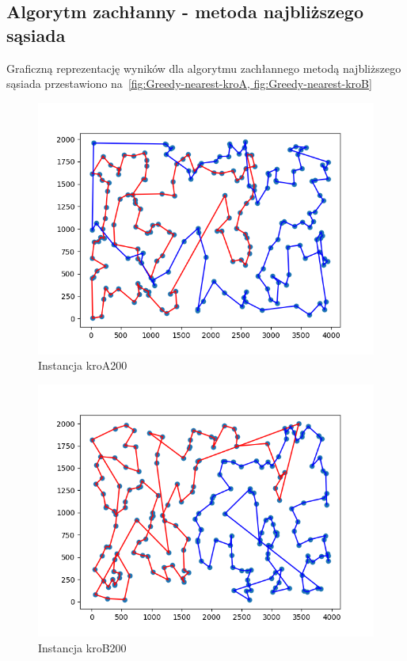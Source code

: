 \documentclass[11pt]{article}
\begin{document}
\subsection{Algorytm zachłanny - metoda najbliższego sąsiada}\label{subsec:algorytm-zachanny---metoda-najblizszego-sasiada2}

Graficzną reprezentację wyników dla algorytmu zachłannego metodą najbliższego sąsiada przestawiono na~\ref{fig:Greedy-nearest-kroA, fig:Greedy-nearest-kroB}
\begin{figure}[H]
    \centering
    \includegraphics{best_paths/greedy_nearest_neighbor_kroA200.tsp.png}
    \caption{Instancja kroA200}
    \label{fig:Greedy-nearest-kroA}
\end{figure}
\begin{figure}[H]
    \centering
    \includegraphics{best_paths/greedy_nearest_neighbor_kroB200.tsp.png}
    \caption{Instancja kroB200}
    \label{fig:Greedy-nearest-kroB}
\end{figure}
\end{document}

